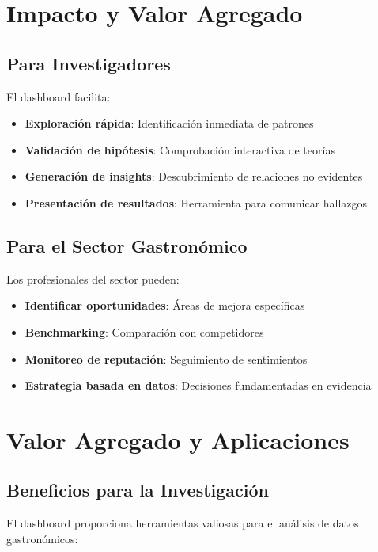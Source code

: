 \documentclass[12pt,a4paper,twoside,openany]{book}
\begin{document}
\section{Impacto y Valor Agregado}

\subsection{Para Investigadores}

El dashboard facilita:
\begin{itemize}
    \item \textbf{Exploración rápida}: Identificación inmediata de patrones
    \item \textbf{Validación de hipótesis}: Comprobación interactiva de teorías
    \item \textbf{Generación de insights}: Descubrimiento de relaciones no evidentes
    \item \textbf{Presentación de resultados}: Herramienta para comunicar hallazgos
\end{itemize}

\subsection{Para el Sector Gastronómico}

Los profesionales del sector pueden:
\begin{itemize}
    \item \textbf{Identificar oportunidades}: Áreas de mejora específicas
    \item \textbf{Benchmarking}: Comparación con competidores
    \item \textbf{Monitoreo de reputación}: Seguimiento de sentimientos
    \item \textbf{Estrategia basada en datos}: Decisiones fundamentadas en evidencia
\end{itemize}

\section{Valor Agregado y Aplicaciones}

\subsection{Beneficios para la Investigación}

El dashboard proporciona herramientas valiosas para el análisis de datos gastronómicos:
\end{document}
